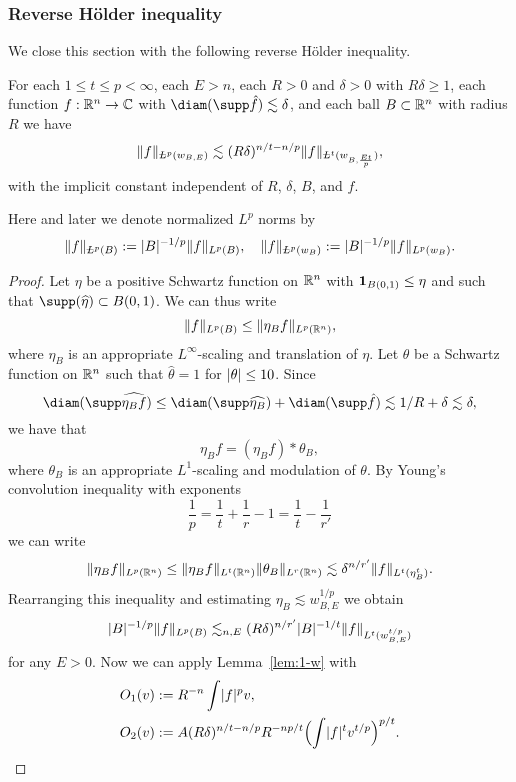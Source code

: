 \subsubsection{Reverse H\"older inequality}
We close this section with the following reverse H\"older inequality.
\begin{corollary}[{cf.\ \cite[Corollary 4.1]{MR3592159}}]
\label{cor:rev-holder}
For each $1 \leq t \leq p < \infty$, each $E>n$, each $R>0$ and $\delta>0$ with $R\delta \geq 1$, each function $f : \mathbb{R}^{n} \to \mathbb{C}$ with $\diam(\supp \hat{f}) \lesssim \delta$, and each ball $B \subset \mathbb{R}^n$ with radius $R$ we have
\begin{equation}
\label{eq:rev-holder}
\norm{f}_{\avL^p(w_{B,E})}
\lesssim
(R\delta)^{n/t-n/p}
\norm{f}_{\avL^t (w_{B,\frac{E t}{p}})},
\end{equation}
with the implicit constant independent of $R$, $\delta$, $B$, and $f$.
\end{corollary}
Here and later we denote normalized $L^{p}$ norms by
\begin{equation}
\label{eq:avL}
\norm{f}_{\avL^{p}(B)} := \abs{B}^{-1/p} \norm{f}_{L^{p}(B)},
\quad
\norm{f}_{\avL^{p}(w_{B})} := \abs{B}^{-1/p} \norm{f}_{L^{p}(w_{B})}.
\end{equation}
\begin{proof}
Let $\eta$ be a positive Schwartz function on $\mathbb{R}^n$ with $\mathbf{1}_{B(0,1)}\le \eta$ and such that $\supp (\widehat{\eta}) \subset B(0,1)$.
We can thus write
\[
\lVert f\rVert_{L^p(B)}
\le
\lVert\eta_B f\rVert_{L^p(\mathbb{R}^n)},
\]
where $\eta_{B}$ is an appropriate $L^{\infty}$-scaling and translation of $\eta$.
Let $\theta$ be a Schwartz function on $\mathbb{R}^{n}$ such that $\hat{\theta} = 1$ for $\lvert\theta\rvert \leq 10$.
Since
\[
\diam(\supp \widehat{\eta_{B} f})
\leq
\diam(\supp \widehat{\eta_{B}}) + \diam(\supp \hat{f})
\lesssim
1/R + \delta
\lesssim
\delta,
\]
we have that
\[
\eta_B f
=
(\eta_B f)* \theta_B,
\]
where $\theta_{B}$ is an appropriate $L^{1}$-scaling and modulation of $\theta$.
By Young's convolution inequality with exponents
\[
\frac{1}p=\frac1{t}+\frac1{r}-1=\frac{1}{t}-\frac1{r'}
\]
we can write
\[
\lVert\eta_B f\rVert_{L^p(\mathbb{R}^n)}
\le
\lVert\eta_B f\rVert_{L^t(\mathbb{R}^n)} \lVert\theta_B\rVert_{L^r(\mathbb{R}^n)}
\lesssim
\delta^{n/r'} \lVert f\rVert_{L^t(\eta_B^{t})}.
\]
Rearranging this inequality and estimating $\eta_{B} \lesssim w_{B,E}^{1/p}$ we obtain
\[
\lvert B\rvert^{-1/p} \lVert f\rVert_{L^p(B)}
\lesssim_{n,E}
(R\delta)^{n/r'} \lvert B\rvert^{-1/t} \lVert f\rVert_{L^t(w_{B,E}^{t/p})}
\]
for any $E>0$.
Now we can apply Lemma~\ref{lem:1-w} with
\begin{align*}
O_{1}(v) &:= R^{-n} \int \lvert f\rvert^{p} v,\\
O_{2}(v) &:= A (R\delta)^{n/t-n/p} R^{-n p/t} \Bigl( \int \lvert f\rvert^{t} v^{t/p} \Bigr)^{p/t}.
\qedhere
\end{align*}
\end{proof}

